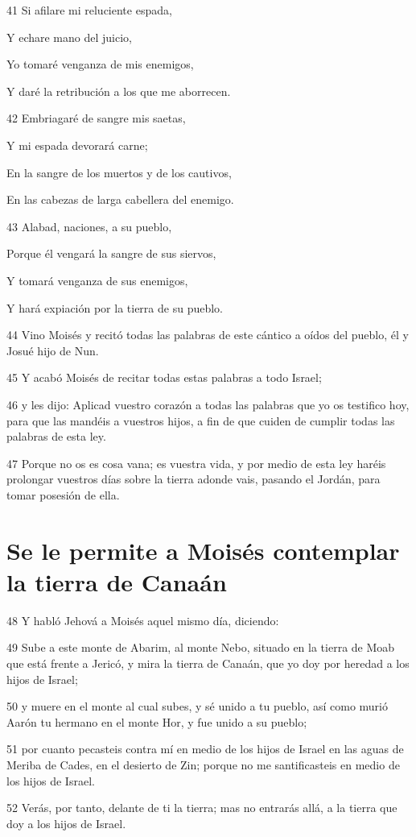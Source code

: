 \par 41 Si afilare mi reluciente espada,
\par Y echare mano del juicio,
\par Yo tomaré venganza de mis enemigos,
\par Y daré la retribución a los que me aborrecen. 
\par 42 Embriagaré de sangre mis saetas,
\par Y mi espada devorará carne;
\par En la sangre de los muertos y de los cautivos,
\par En las cabezas de larga cabellera del enemigo.
\par 43 Alabad, naciones, a su pueblo, 
\par Porque él vengará la sangre de sus siervos, 
\par Y tomará venganza de sus enemigos,
\par Y hará expiación por la tierra de su pueblo.
\par 44 Vino Moisés y recitó todas las palabras de este cántico a oídos del pueblo, él y Josué hijo de Nun.
\par 45 Y acabó Moisés de recitar todas estas palabras a todo Israel;
\par 46 y les dijo: Aplicad vuestro corazón a todas las palabras que yo os testifico hoy, para que las mandéis a vuestros hijos, a fin de que cuiden de cumplir todas las palabras de esta ley.
\par 47 Porque no os es cosa vana; es vuestra vida, y por medio de esta ley haréis prolongar vuestros días sobre la tierra adonde vais, pasando el Jordán, para tomar posesión de ella.

\section*{Se le permite a Moisés contemplar la tierra de Canaán}

\par 48 Y habló Jehová a Moisés aquel mismo día, diciendo:
\par 49 Sube a este monte de Abarim, al monte Nebo, situado en la tierra de Moab que está frente a Jericó, y mira la tierra de Canaán, que yo doy por heredad a los hijos de Israel;
\par 50 y muere en el monte al cual subes, y sé unido a tu pueblo, así como murió Aarón tu hermano en el monte Hor, y fue unido a su pueblo;
\par 51 por cuanto pecasteis contra mí en medio de los hijos de Israel en las aguas de Meriba de Cades, en el desierto de Zin; porque no me santificasteis en medio de los hijos de Israel.
\par 52 Verás, por tanto, delante de ti la tierra; mas no entrarás allá, a la tierra que doy a los hijos de Israel.

